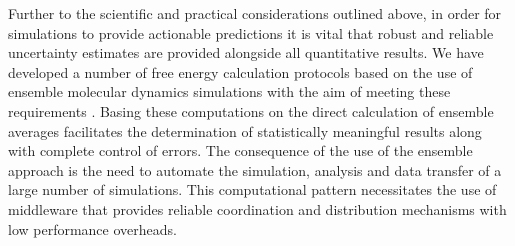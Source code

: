 Further to the scientific and practical considerations outlined above, in
order for simulations to provide actionable predictions it is vital that
robust and reliable uncertainty estimates are provided alongside all
quantitative results. We have developed a number of free energy calculation
protocols based on the use of ensemble molecular dynamics simulations with the
aim of meeting these requirements \cite{Sadiq2008, Sadiq2010, Wan2017brd4,
Wan2017trk}. Basing these computations on the direct calculation of ensemble
averages facilitates the determination of statistically meaningful results
along with complete control of errors. The consequence of the use of the
ensemble approach is the need to automate the simulation, analysis and data
transfer of a large number of simulations. This computational pattern
necessitates the use of middleware that provides reliable coordination and
distribution mechanisms with low performance overheads.